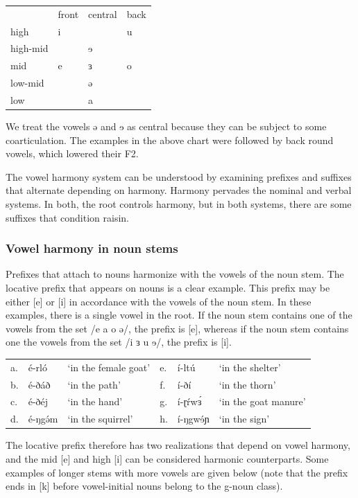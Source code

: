 \ea
\begin{tabular}[t]{llll}
&	front	&	central	&	back\\
high	&	i	&	&	u\\
high-mid	&	&	ɘ\\
mid 	&	e	&	ɜ	&	o\\
low-mid	&	&	ə\\
low	&	&	a\\
\end{tabular}
\z

We treat the vowels ə and ɘ as central because they can be subject to some coarticulation. The examples in the above chart were followed by back round vowels, which lowered their F2. 

The vowel harmony system can be understood by examining prefixes and suffixes that alternate depending on harmony. Harmony pervades the nominal and verbal systems. In both, the root controls harmony, but in both systems, there are some suffixes that condition raisin.

\subsubsection{Vowel harmony in noun stems}
Prefixes that attach to nouns harmonize with the vowels of the noun stem. The locative prefix that appears on nouns is a clear example. This prefix may be either [e] or [i] in accordance with the vowels of the noun stem. In these examples, there is a single vowel in the root. If the noun stem contains one of the vowels from the set /e a o ə/, the prefix is [e], whereas if the noun stem contains one the vowels from the set /i ɜ u ɘ/, the prefix is [i]. 

\ea
\begin{tabular}[t]{llllll}
	a.&	é-rló		&	‘in the female goat’		
	&	e.&	í-ltú	&	‘in the shelter’\\
	b.&	é-ðáð		&	‘in the path’		&	f.&	í-ðí	&	‘in the thorn’\\
	c.&	é-ðéj		&	‘in the hand’		&	g.&	í-ɽŕwɜ́	&	‘in the goat manure’\\
	d.&	é-ŋgə́m 		&	‘in the squirrel’	&	h.&	í-ŋgwɘ́ɲ	&	‘in the sign’ \\
\end{tabular}
\z

The locative prefix therefore has two realizations that depend on vowel harmony, and the mid [e] and high [i] can be considered harmonic counterparts. Some examples of longer stems with more vowels are given below (note that the prefix ends in [k] before vowel-initial nouns belong to the g-noun class).

